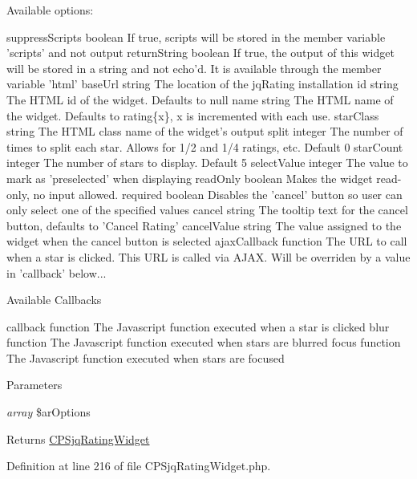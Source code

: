 Available options:

suppressScripts boolean If true, scripts will be stored in the member variable 'scripts' and not output returnString boolean If true, the output of this widget will be stored in a string and not echo'd. It is available through the member variable 'html' baseUrl string The location of the jqRating installation id string The HTML id of the widget. Defaults to null name string The HTML name of the widget. Defaults to rating\{x\}, x is incremented with each use. starClass string The HTML class name of the widget's output split integer The number of times to split each star. Allows for 1/2 and 1/4 ratings, etc. Default 0 starCount integer The number of stars to display. Default 5 selectValue integer The value to mark as 'preselected' when displaying readOnly boolean Makes the widget read-\/only, no input allowed. required boolean Disables the 'cancel' button so user can only select one of the specified values cancel string The tooltip text for the cancel button, defaults to 'Cancel Rating' cancelValue string The value assigned to the widget when the cancel button is selected ajaxCallback function The URL to call when a star is clicked. This URL is called via AJAX. Will be overriden by a value in 'callback' below...

Available Callbacks

callback function The Javascript function executed when a star is clicked blur function The Javascript function executed when stars are blurred focus function The Javascript function executed when stars are focused


\begin{DoxyParams}{Parameters}
\item[{\em array}]\$arOptions \end{DoxyParams}
\begin{DoxyReturn}{Returns}
\hyperlink{classCPSjqRatingWidget}{CPSjqRatingWidget} 
\end{DoxyReturn}


Definition at line 216 of file CPSjqRatingWidget.php.




